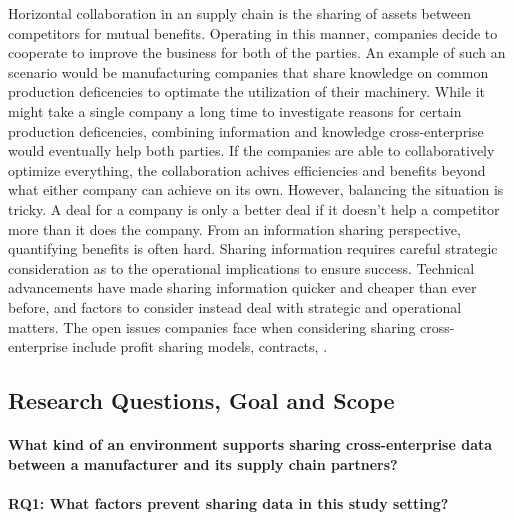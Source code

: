 Horizontal collaboration in an supply chain \cite{} is the sharing of assets between competitors for mutual benefits. Operating in this manner, companies decide to cooperate to improve the business for both of the parties. An example of such an scenario would be manufacturing companies that share knowledge on common production deficencies to optimate the utilization of their machinery. While it might take a single company a long time to investigate reasons for certain production deficencies, combining information and knowledge cross-enterprise would eventually help both parties. If the companies are able to collaboratively optimize everything, the collaboration achives efficiencies and benefits beyond what either company can achieve on its own. However, balancing the situation is tricky. A deal for a company is only a better deal if it doesn't help a competitor more than it does the company. From an information sharing perspective, quantifying benefits is often hard. Sharing information requires careful strategic consideration as to the operational implications to ensure success. Technical advancements have made sharing information quicker and cheaper than ever before, and factors to consider instead deal with strategic and operational matters. The open issues companies face when considering sharing cross-enterprise include profit sharing models, contracts,  \cite{}. 


\subsection{Research Questions, Goal and Scope}


\paragraph*{What kind of an environment supports sharing cross-enterprise data between a manufacturer and its supply chain partners?}



\paragraph*{RQ1: What factors prevent sharing data in this study setting?}

